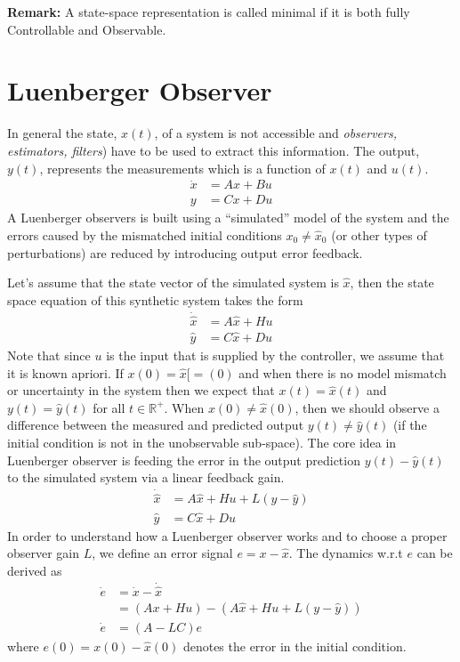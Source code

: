 \documentclass[twoside]{article}
\begin{document}
\textbf{Remark:} A state-space representation is called minimal 
if it is both fully Controllable and Observable. 


\section{Luenberger Observer}

In general the state, $x(t)$, of a system
is not accessible and \textit{observers, estimators, filters})
have to be used to extract this information.
The output, $y(t)$, represents the measurements
which is a function of $x(t)$ and $u(t)$.
%
\begin{align*}
  \dot{x} &= A x + B u
  \\
  y &= C x + D u
\end{align*}
%
A Luenberger observers is built using a ``simulated'' model of the 
system and the errors caused by the mismatched initial conditions 
$x_0 \neq \hat{x}_0$ (or other types of perturbations)
are reduced by introducing output error feedback.

Let's assume that the state vector of the simulated system
is $\hat{x}$, then the state space equation of this
synthetic system takes the form
%
\begin{align*}
  \dot{\hat{x}} &= A \hat{x} + H u
  \\
  \hat{y} &= C \hat{x} + D u
\end{align*}
%
Note that since $u$ is the input that is supplied by the 
controller, we assume that it is known apriori. If $x(0) = \hat{x}[=(0)$ and
when there is no model mismatch or uncertainty in the system
then we expect that $x(t) = \hat{x}(t)$ and $y(t) = \hat{y}(t)$ 
for all $t \in \mathbb{R}^+$. When $x(0) \neq \hat{x}(0)$, then we should observe a 
difference between the measured and predicted output
$y(t) \neq \hat{y}(t)$ (if the initial condition is not in the 
unobservable sub-space). The core idea in Luenberger observer
is feeding the error in the output prediction 
$y(t) - \hat{y}(t)$ to the simulated system via a linear feedback gain.
%
\begin{align*}
  \dot{\hat{x}} &= A \hat{x} + H u + L \left( y - \hat{y} \right) 
  \\
  \hat{y} &= C \hat{x} + D u
\end{align*}
%
In order to understand how a Luenberger observer works and
to choose a proper observer gain $L$, we define an error signal
$e = x - \hat{x}$. The dynamics w.r.t $e$ can be derived
as
%
\begin{align*}
  \dot{e} &= \dot{x} - \dot{\hat{x}}
        \\
     &= \left( A x + H u \right)
  - \left( A \hat{x} + H u + L \left( y - \hat{y} \right)
       \right)
\\
   \dot{e} &= \left( A - L C \right) e
\end{align*}
%
where $e(0) = x(0) - \hat{x}(0)$ denotes the error in the initial
condition. 
\end{document}
